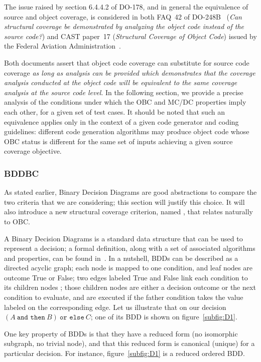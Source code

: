 \documentclass[a4paper,12pt,twoside]{article}
\newcommand{\andthen}{\texttt{and then}}
\newcommand{\orelse}{\texttt{or else}}
\begin{document}
The issue raised by section 6.4.4.2 of DO-178, and in general the
equivalence of source and object coverage, is considered in both FAQ~42
of DO-248B~\cite{do248b} (\emph{Can structural coverage be demonstrated
by analyzing the object code instead of the source code?}) and CAST
paper~17 (\emph{Structural Coverage of Object Code}) issued by the
Federal Aviation Administration~\cite{cast17}.

Both documents assert that object code coverage can substitute for
source code coverage \emph{as long as analysis can be provided which
demonstrates that the coverage analysis conducted at the object code
will be equivalent to the same coverage analysis at the source code
level}. In the following section, we provide a precise analysis of
the conditions under which the OBC and MC/DC properties imply each
other, for a given set of test cases. It should be noted that such an
equivalence applies only in the context of a given code generator and
coding guidelines: different code generation algorithms may produce
object code whose OBC status is different for the same set of inputs
achieving a given source coverage objective.


\subsubsection{BDDBC}

As stated earlier, Binary Decision Diagrams are good abstractions to
compare the two criteria that we are considering; this section will
justify this choice. It will also introduce a new structural coverage
criterion, named , that
relates naturally to OBC.

A Binary Decision Diagrams is a standard data structure that can be
used to represent a decision; a formal definition, along with a set of
associated algorithms and properties, can be found
in~\cite{bryant86:graphs}.  In a nutshell, BDDs can be described as a
directed acyclic graph; each node is mapped to one condition, and leaf
nodes are outcome True or False; two edges labeled True and False link
each condition to its children nodes ; those children nodes are either
a decision outcome or the next condition to evaluate, and are executed
if the father condition takes the value labeled on the corresponding
edge. Let us illustrate that on our decision
$(A \ \andthen{} \ B) \ \orelse{} \ C$; one of its BDD is shown on
figure~\ref{subfig:D1}.

One key property of BDDs is that they have a reduced form (no
isomorphic subgraph, no trivial node), and that this reduced form is
canonical (unique) for a particular decision. For instance,
figure~\ref{subfig:D1} is a reduced ordered BDD.
\end{document}
